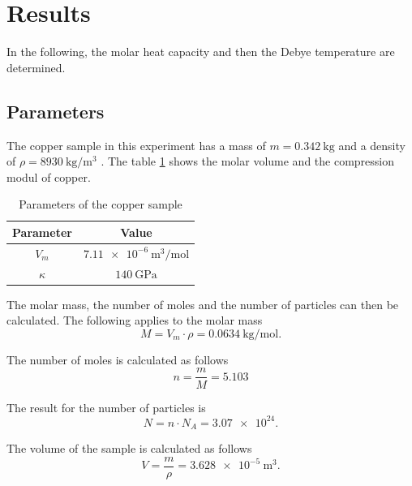 \section{Results}
\label{sec:results}

In the following, the molar heat capacity and then the Debye temperature are determined.

\subsection{Parameters}
\label{sec:parameters}

The copper sample in this experiment has a mass of $m = \qty{0.342}{\kilo\gram}$ \textnormal{\cite{molar_heat}} and a density of
$ \rho = \qty{8930}{\kilo\gram \per \meter^3 }$ \textnormal{\cite{kupfer}}.
The table \ref{tab:parameters} shows the molar volume and the compression modul of copper.
\begin{table}[H]
	\centering
	\caption{Parameters of the copper sample}
	\label{tab:parameters}
	\begin{tabular}{c c }
		\toprule
		Parameter & Value \\
		\midrule
		$V_m$ & $\qty{7.11e-6}{\meter^3 \per \mol}$ \cite{chemie_kupfer}\\
		$\kappa$ & $\qty{140} {\giga\pascal}$ \cite{perioden_kupfer}\\
		\bottomrule
	\end{tabular}
\end{table}

The molar mass, the number of moles and the number of particles can then be calculated.
The following applies to the molar mass
\begin{equation*}
	M = V_m \cdot \rho = \qty{0.0634}{\kilo\gram \per \mol}.
\end{equation*}

The number of moles is calculated as follows
\begin{equation*}
	n = \frac{m}{M} = \num{5.103}
\end{equation*}

The result for the number of particles is
\begin{equation*}
	N = n \cdot N_A = \num{3.07e24}.
\end{equation*}

The volume of the sample is calculated as follows
\begin{equation*}
	V = \frac{m}{\rho} = \qty{3.628e-5}{\meter^3}.
\end{equation*}

